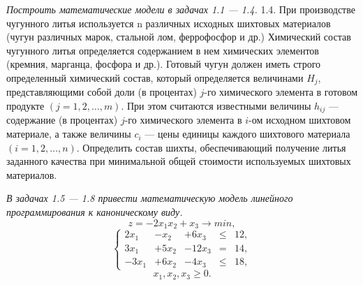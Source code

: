 \documentclass{article}
\begin{document}
\textit{Построить математические модели в задачах 1.1 — 1.4.}
1.4. При производстве чугунного литья используется n различных исходных шихтовых материалов (чугун различных марок, стальной лом, феррофосфор и др.) Химический состав чугунного литья определяется содержанием в нем химических элементов (кремния, марганца, фосфора и др.). Готовый чугун должен иметь строго определенный химический состав, который определяется величинами $H_j$, представляющими собой доли (в процентах) $j$-го химического элемента в готовом продукте $(j=1,2,\ldots,m)$. При этом считаются известными величины $h_{ij}$ — содержание (в процентах) $j$-го химического элемента в $i$-ом исходном шихтовом материале, а также величины $c_i$ — цены единицы каждого шихтового материала $(i=1,2,\ldots,n)$. Определить состав шихты, обеспечивающий получение литья заданного качества при минимальной общей стоимости используемых шихтовых материалов.


\textit{В задачах 1.5 — 1.8 привести математическую модель линейного программирования к каноническому виду.}
\[z=-2x_1 x_2 + x_3 \rightarrow min,\]
$$
\left\{
\begin{array}{ccccc}
2x_1 &-x_2 &+6x_3 &\leq &12, \\
3x_1 &+5x_2 &-12x_3 &= &14, \\
-3x_1 &+6x_2 &-4x_3 &\leq &18,
\end{array}
\right.
$$
\[x_1, x_2, x_3\geq 0.\]
\end{document}
